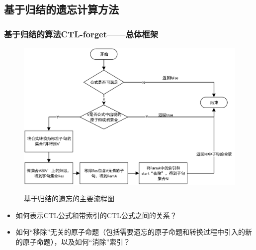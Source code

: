 \documentclass[aspectratio=1610, 9pt, CJK]{beamer}
\begin{document}
%	

\subsection{基于归结的遗忘计算方法}
\begin{frame}
	\frametitle{基于归结的算法CTL-forget——{\footnotesize 总体框架}}
	{\footnotesize
		\begin{figure}
			\centering
			\includegraphics[scale=0.5]{figures/frame2}\\
			\caption{基于归结的遗忘的主要流程图}
			\label{Fig:chapter05:v1uv2}
		\end{figure}
		\pause
		\begin{itemize}
			\item 如何表示CTL公式和带索引的CTL公式之间的关系？
			\item 如何“移除”无关的原子命题（包括需要遗忘的原子命题和转换过程中引入的新的原子命题），以及如何“消除”索引？
		\end{itemize}
	}
\end{frame}
\end{document}
